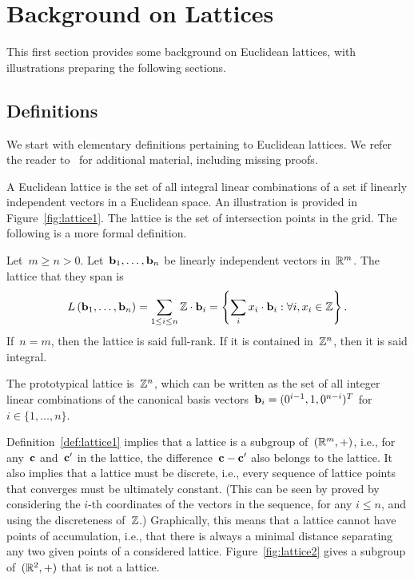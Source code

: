\section{Background on Lattices}
\label{se:back}



This first section provides some background on Euclidean lattices, with illustrations
preparing the following sections.  


\subsection{Definitions}

We start with elementary definitions pertaining to Euclidean lattices. 
We refer the reader to~\cite{Siegel89} for additional material, including missing proofs.


A Euclidean lattice is the set of all integral linear combinations of a set if linearly independent vectors in a Euclidean space. 
An illustration is provided in Figure~\ref{fig:lattice1}. The lattice is the set of intersection points in the grid. 
The following is a more formal definition.

\begin{definition}
\label{def:lattice1}
Let~$m\geq n >0$. Let~${\bf b}_1, \ldots, {\bf b}_n$ be linearly independent vectors in~$\mathbb{R}^m$.
The lattice that they span is
\[
 L\left({\bf b}_1, \ldots, {\bf b}_n\right) = \sum_{1 \leq i \leq n} \mathbb{Z} \cdot {\bf b}_i = \left\{\sum_i x_i \cdot {\bf b}_i: \forall i, x_i \in \mathbb{Z}\right\}. 
\]
If~$n=m$, then the lattice is said full-rank. If it is contained in~$\mathbb{Z}^n$, then it is said integral. 
\end{definition}

The prototypical lattice is~$\mathbb{Z}^n$, which can be written as the set of all integer linear combinations
of the canonical basis vectors~${\bf b}_i = (0^{i-1}, 1, 0^{n-i})^T$ for~$i \in \{1,\ldots,n\}$.  

Definition~\ref{def:lattice1} implies that a lattice is a subgroup of~$(\mathbb{R}^m,+)$, i.e., for any~${\bf c}$ and~${\bf c}'$ in the lattice, the difference~${\bf c} - {\bf c}'$ also belongs to the lattice. It also implies that a lattice must be discrete, i.e., every sequence of lattice points that converges must be ultimately constant. (This can be seen by proved by considering the $i$-th coordinates of 
the vectors in the sequence, for any $i \leq n$, and using the discreteness of~$\mathbb{Z}$.)  Graphically, this means that 
a lattice cannot have points of accumulation, i.e., that there is always a minimal distance separating any two given points of a
considered lattice. Figure~\ref{fig:lattice2} gives a subgroup of~$(\mathbb{R}^2,+)$ that is not a lattice. 

